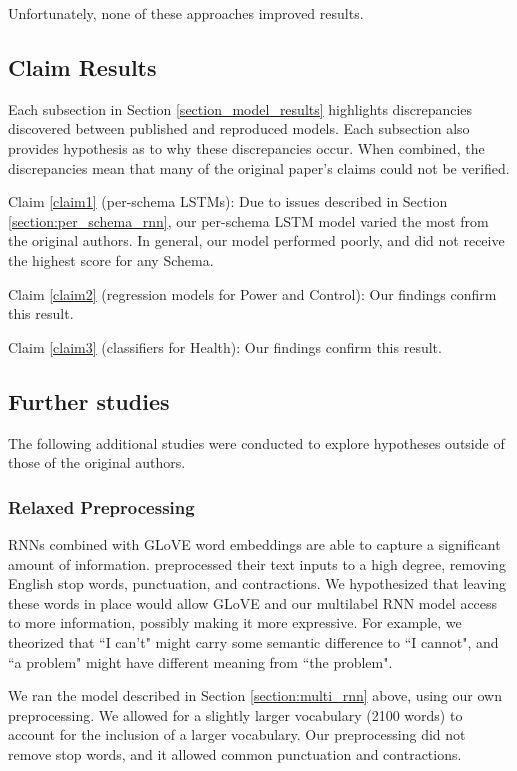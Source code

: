 \documentclass[11pt,a4paper]{article}
\begin{document}
Unfortunately, none of these approaches improved results.

\subsection{Claim Results}
Each subsection in Section \ref{section_model_results} highlights discrepancies discovered between published and reproduced models. Each subsection also provides hypothesis as to why these discrepancies occur. When combined, the discrepancies mean that many of the original paper's claims could not be verified. 

Claim \ref{claim1} (per-schema LSTMs): Due to issues described in Section \ref{section:per_schema_rnn}, our per-schema LSTM model varied the most from the original authors. In general, our model performed poorly, and did not receive the highest score for any Schema.  

Claim \ref{claim2} (regression models for Power and Control): Our findings confirm this result. 

Claim \ref{claim3} (classifiers for Health): Our findings confirm this result. 

\subsection{Further studies}
\label{further_studies}
The following additional studies were conducted to explore hypotheses outside of those of the original authors. 
\subsubsection{Relaxed Preprocessing}
\label{section:relaxed_preprocessing}
RNNs combined with GLoVE word embeddings are able to capture a significant amount of information. \citeauthor{burger_2021} preprocessed their text inputs to a high degree, removing English stop words, punctuation, and contractions. We hypothesized that leaving these words in place would allow GLoVE and our multilabel RNN model access to more information, possibly making it more expressive. For example, we theorized that ``I can't" might carry some semantic difference to ``I cannot", and ``a problem" might have different meaning from ``the problem". 

We ran the model described in Section \ref{section:multi_rnn} above, using our own preprocessing. We allowed for a slightly larger vocabulary (2100 words) to account for the inclusion of a larger vocabulary. Our preprocessing did not remove stop words, and it allowed common punctuation and contractions. 
\end{document}
